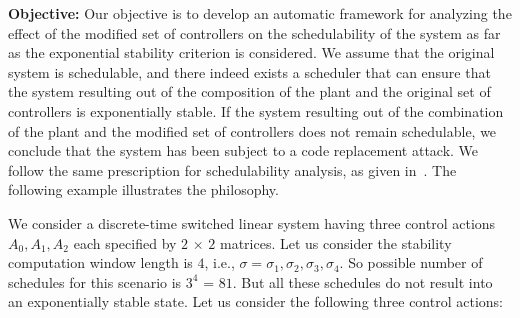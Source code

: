 \noindent
{\bf Objective:} 
Our objective is to develop an automatic framework for analyzing the effect of the modified set of controllers on the schedulability of the system as far as the 
exponential stability criterion is considered.
We assume that the original system is schedulable, and there indeed exists a scheduler that can ensure that the system resulting out of the composition of the 
plant and the original set of controllers is exponentially stable. 
 If the system resulting out of 
the combination of the plant and the modified set of controllers does not 
remain schedulable, we conclude that the system has been subject to a code replacement attack. We follow the same prescription for schedulability analysis, as given in~\cite{GhoshMDHD16}. %
The following example illustrates the philosophy. 
     
We consider a discrete-time switched linear system having
three control actions ${A_0, A_1, A_2}$ each specified by $2$ $\times$ $2$ matrices. Let us consider the stability computation window length is $4$, i.e., $\sigma = { \sigma_1, \sigma_2, 
\sigma_3, \sigma_4}$. So possible number of schedules for this scenario is $3^4$ = $81$.  
But all these schedules do not result into an exponentially stable state. 
% 
% 
Let us consider the following three control actions:

